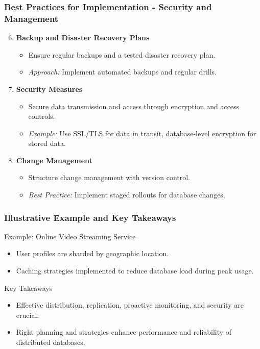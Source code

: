 \documentclass[aspectratio=169]{beamer}
\begin{document}
\begin{frame}[fragile]
    \frametitle{Best Practices for Implementation - Security and Management}
    \begin{enumerate}
        \setcounter{enumi}{5}
        \item \textbf{Backup and Disaster Recovery Plans}
            \begin{itemize}
                \item Ensure regular backups and a tested disaster recovery plan.
                \item \textit{Approach:} Implement automated backups and regular drills.
            \end{itemize}

        \item \textbf{Security Measures}
            \begin{itemize}
                \item Secure data transmission and access through encryption and access controls.
                \item \textit{Example:} Use SSL/TLS for data in transit, database-level encryption for stored data.
            \end{itemize}

        \item \textbf{Change Management}
            \begin{itemize}
                \item Structure change management with version control.
                \item \textit{Best Practice:} Implement staged rollouts for database changes.
            \end{itemize}
    \end{enumerate}
\end{frame}

\begin{frame}[fragile]
    \frametitle{Illustrative Example and Key Takeaways}
    \begin{block}{Example: Online Video Streaming Service}
        \begin{itemize}
            \item User profiles are sharded by geographic location.
            \item Caching strategies implemented to reduce database load during peak usage.
        \end{itemize}
    \end{block}

    \begin{block}{Key Takeaways}
        \begin{itemize}
            \item Effective distribution, replication, proactive monitoring, and security are crucial.
            \item Right planning and strategies enhance performance and reliability of distributed databases.
        \end{itemize}
    \end{block}
\end{frame}
\end{document}
